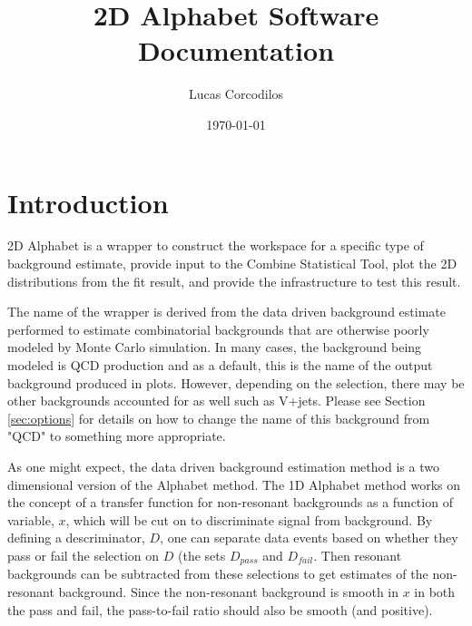 \documentclass[letter]{article}
\title{2D Alphabet Software Documentation}
\author{Lucas Corcodilos}
\date{\today}
\begin{document}
\maketitle
\titlespacing{\section}{0pt}{5pt}{0pt}
\titlespacing{\subsection}{0pt}{5pt}{0pt}
\titlespacing{\subsubsection}{0pt}{5pt}{0pt}
\setlength{\parskip}{1em}

\section{Introduction}
\label{sec:intro}
    2D Alphabet is a wrapper to construct the workspace for a specific type of background estimate, provide input to the Combine Statistical Tool, plot the 2D distributions from the fit result, and provide the infrastructure to test this result. 

    The name of the wrapper is derived from the data driven background estimate performed to estimate combinatorial backgrounds that are otherwise poorly modeled by Monte Carlo simulation. In many cases, the background being modeled is QCD production and as a default, this is the name of the output background produced in plots. However, depending on the selection, there may be other backgrounds accounted for as well such as V+jets. Please see Section \ref{sec:options} for details on how to change the name of this background from "QCD" to something more appropriate.

    As one might expect, the data driven background estimation method is a two dimensional version of the Alphabet method. The 1D Alphabet method works on the concept of a transfer function for non-resonant backgrounds as a function of variable, $x$, which will be cut on to discriminate signal from background. By defining a descriminator, $D$, one can separate data events based on whether they pass or fail the selection on $D$ (the sets $D_{pass}$ and $D_{fail}$. Then resonant backgrounds can be subtracted from these selections to get estimates of the non-resonant background. Since the non-resonant background is smooth in $x$ in both the pass and fail, the pass-to-fail ratio should also be smooth (and positive). 
\end{document}
